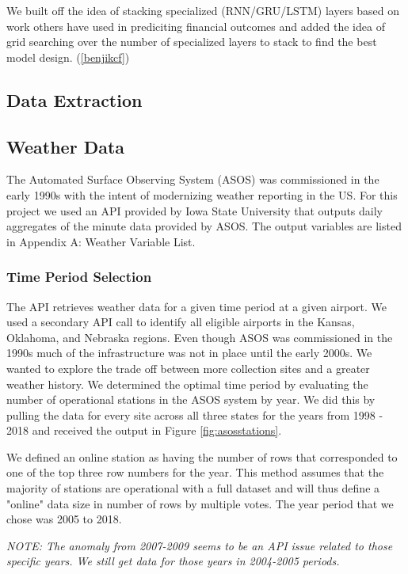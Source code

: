 \documentclass[twoside,11pt]{article}
\begin{document}
We built off the idea of stacking specialized (RNN/GRU/LSTM) layers based on work others have used in prediciting financial outcomes and added the idea of grid searching over the number of specialized layers to stack to find the best model design. (\ref{benjikcf})

\subsection{Data Extraction}

\subsection{Weather Data}
	The Automated Surface Observing System (ASOS) was commissioned in the early 1990s with the intent of modernizing weather reporting in the US. For this project we used an API provided by Iowa State University that outputs daily aggregates of the minute data provided by ASOS. The output variables are listed in Appendix A: Weather Variable List.
	
	\subsubsection{Time Period Selection}
	The API retrieves weather data for a given time period at a given airport. We used a secondary API call to identify all eligible airports in the Kansas, Oklahoma, and Nebraska regions. Even though ASOS was commissioned in the 1990s much of the infrastructure was not in place until the early 2000s. We wanted to explore the trade off between more collection sites and a greater weather history. We determined the optimal time period by evaluating the number of operational stations in the ASOS system by year. We did this by pulling the data for every site across all three states for the years from 1998 - 2018 and received the output in Figure \ref{fig:asosstations}. 
	
	We defined an online station as having the number of rows that corresponded to one of the top three row numbers for the year. This method assumes that the majority of stations are operational with a full dataset and will thus define a "online" data size in number of rows by multiple votes. The year period that we chose was 2005 to 2018.
	
	\textit{NOTE: The anomaly from 2007-2009 seems to be an API issue related to those specific years. We still get data for those years in 2004-2005 periods.}
	
\end{document}

